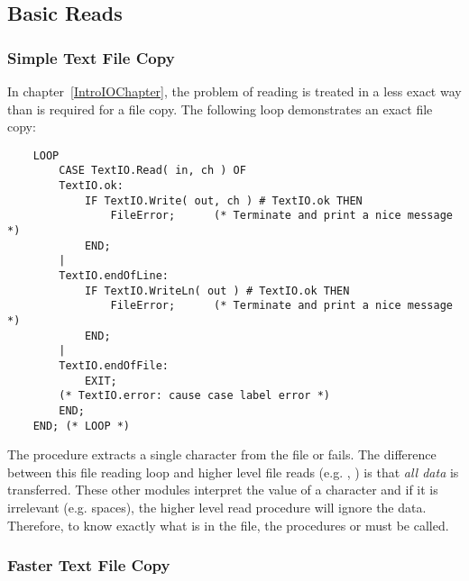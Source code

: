 \subsection{Basic  Reads}

\subsubsection{Simple Text File Copy}

In chapter~\ref{IntroIOChapter}, the problem of reading is treated
in a less exact way than is required for a file copy.  The following
loop demonstrates an exact file copy:

\begin{verbatim}
    LOOP
        CASE TextIO.Read( in, ch ) OF
        TextIO.ok:
            IF TextIO.Write( out, ch ) # TextIO.ok THEN
                FileError;      (* Terminate and print a nice message *)
            END;
        |
        TextIO.endOfLine:
            IF TextIO.WriteLn( out ) # TextIO.ok THEN
                FileError;      (* Terminate and print a nice message *)
            END;
        |
        TextIO.endOfFile:
            EXIT;
        (* TextIO.error: cause case label error *)
        END;
    END; (* LOOP *)
\end{verbatim}

The procedure  extracts a single character from
the file or fails.  The difference between this file reading loop
and higher level file reads (e.g. , )
is that {\em all data} is transferred.  These other modules interpret
the value of a character and if it is irrelevant (e.g. spaces), the
higher level read procedure will ignore the data.  Therefore, to know
exactly what is in the file, the procedures  or
 must be called.


    
\subsubsection{Faster Text File Copy}
\label{ReadChars}

